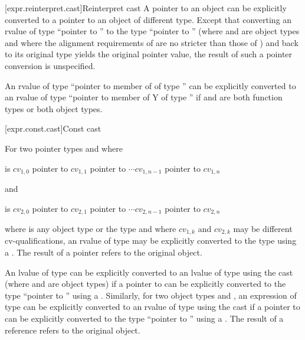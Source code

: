 \documentclass[american]{book}
\begin{document}
[expr.reinterpret.cast]{Reinterpret cast}
\setcounter{Paras}{6}
\pnum
A pointer to an
object can be explicitly converted to a pointer to an
object of different type. Except that converting an rvalue of type
``pointer to \mbox{}'' to the type ``pointer to
\mbox{}'' (where \mbox{} and \mbox{} are
object types and where the alignment requirements of \mbox{} are
no stricter than those of \mbox{}) and back to its original type
yields the original pointer value, the result of such a pointer conversion
is unspecified. 

\setcounter{Paras}{9}
\pnum
An rvalue of type ``pointer to member of \mbox{} of type
\mbox{}'' can be explicitly converted to an rvalue of type
``pointer to member of Y of type \mbox{}'' if \mbox{}
and \mbox{} are both function types or both 
object types.

[expr.const.cast]{Const cast}
\setcounter{Paras}{2}

\pnum
For two pointer types  and  where

\begin{indented}
 is $\mathit{cv}_{1,0}$ pointer to $\mathit{cv}_{1,1}$ pointer
to $\cdots \mathit{cv}_{1,n-1}$ pointer to $\mathit{cv}_{1,n}$ 
\end{indented}

and

\begin{indented}
 is $\mathit{cv}_{2,0}$ pointer to $\mathit{cv}_{2,1}$ pointer
to $\cdots \mathit{cv}_{2,n-1}$ pointer to $\mathit{cv}_{2,n}$ 
\end{indented}

where
 is any
object type or the  type and where
$\mathit{cv}_{1,k}$ and $\mathit{cv}_{2,k}$ may be different
cv-qualifications, an rvalue of type  may be explicitly
converted to the type  using a . The result
of a pointer  refers to the original object.

\pnum
An lvalue of type  can be explicitly converted to an lvalue of
type  using the cast  (where
 and  are
object types) if a pointer to 
can be explicitly converted to the type ``pointer to '' using
a . Similarly, for two
object types  and
, an expression of type  can be explicitly converted
to an rvalue of type  using the cast
 if a pointer to  can be explicitly
converted to the type ``pointer to '' using a
. The result of a reference  refers
to the original object.
\end{document}
